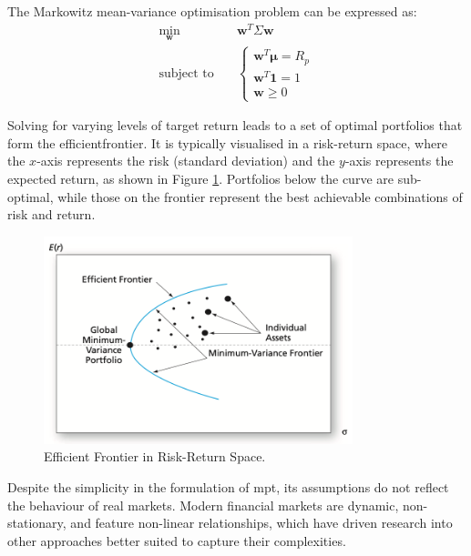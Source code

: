 The Markowitz mean-variance optimisation problem can be expressed as:
\begin{equation}
\begin{aligned}
    \min_{\mathbf{w}} \quad & \mathbf{w}^T \Sigma \mathbf{w} \\
    \text{subject to} \quad &
    \begin{cases}
        \mathbf{w}^T \boldsymbol{\mu} = R_p \\
        \mathbf{w}^T \mathbf{1} = 1 \\
        \mathbf{w} \geq 0
    \end{cases}
\end{aligned}
\end{equation}

Solving for varying levels of target return leads to a set of optimal portfolios that form the \gls{efficientfrontier}. It is typically visualised in a risk-return space, where the $x$-axis represents the risk (standard deviation) and the $y$-axis represents the expected return, as shown in Figure \ref{fig:efficient_frontier}. Portfolios below the curve are sub-optimal, while those on the frontier represent the best achievable combinations of risk and return.

\begin{figure}[ht]
    \centering
    \includegraphics[width=0.8\textwidth]{figures/markowitz-efficient-frontier.png}
    \caption{Efficient Frontier in Risk-Return Space. \cite{Bodie2014}}
    \label{fig:efficient_frontier}
\end{figure}

Despite the simplicity in the formulation of \acrshort{mpt}, its assumptions do not reflect the behaviour of real markets. Modern financial markets are dynamic, non-stationary, and feature non-linear relationships, which have driven research into other approaches better suited to capture their complexities. 
 
